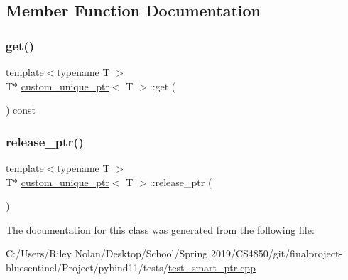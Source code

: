 \subsection{Member Function Documentation}
\mbox{\label{classcustom__unique__ptr_a144002a4e2e04b243b9ac61fbf2d29f2}} 
\subsubsection{\texorpdfstring{get()}{get()}}
{\footnotesize\ttfamily template$<$typename T $>$ \\
T$\ast$ \mbox{\hyperlink{classcustom__unique__ptr}{custom\+\_\+unique\+\_\+ptr}}$<$ T $>$\+::get (\begin{DoxyParamCaption}{ }\end{DoxyParamCaption}) const\hspace{0.3cm}{\ttfamily [inline]}}

\mbox{\label{classcustom__unique__ptr_a1ae319e4cc770addac9d8709447f81bf}} 
\subsubsection{\texorpdfstring{release\_ptr()}{release\_ptr()}}
{\footnotesize\ttfamily template$<$typename T $>$ \\
T$\ast$ \mbox{\hyperlink{classcustom__unique__ptr}{custom\+\_\+unique\+\_\+ptr}}$<$ T $>$\+::release\+\_\+ptr (\begin{DoxyParamCaption}{ }\end{DoxyParamCaption})\hspace{0.3cm}{\ttfamily [inline]}}



The documentation for this class was generated from the following file\+:\begin{DoxyCompactItemize}
\item 
C\+:/\+Users/\+Riley Nolan/\+Desktop/\+School/\+Spring 2019/\+C\+S4850/git/finalproject-\/bluesentinel/\+Project/pybind11/tests/\mbox{\hyperlink{test__smart__ptr_8cpp}{test\+\_\+smart\+\_\+ptr.\+cpp}}\end{DoxyCompactItemize}
